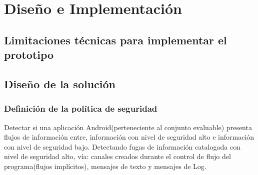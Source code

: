 \label{ch:desing}
\chapter{Diseño e Implementación}

\section{Limitaciones técnicas para implementar el prototipo}

\section{Diseño de la solución} 
\subsection{Definición de la política de seguridad}
Detectar si una aplicación Android(perteneciente al conjunto evaluable) presenta
flujos de información entre, información con nivel de seguridad alto e
información con nivel de seguridad bajo.\newline 
Detectando fugas de información catalogada con nivel de seguridad alto, vía:
canales creados durante el control de flujo del programa(flujos implícitos),
mensajes de texto y mensajes de Log.\newline 

